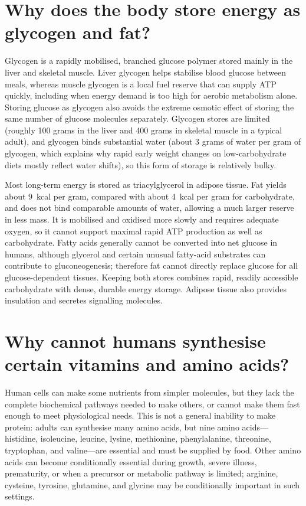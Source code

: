 \documentclass[11pt,oneside]{report}
\begin{document}
\section{Why does the body store energy as glycogen and fat?}

Glycogen is a rapidly mobilised, branched glucose polymer stored mainly in the
liver and skeletal muscle. Liver glycogen helps stabilise blood glucose between
meals, whereas muscle glycogen is a local fuel reserve that can supply ATP
quickly, including when energy demand is too high for aerobic metabolism alone.
Storing glucose as glycogen also avoids the extreme osmotic effect of storing
the same number of glucose molecules separately. Glycogen stores are limited (roughly 100 grams in the liver and 400 grams in
skeletal muscle in a typical adult), and glycogen binds substantial water (about
3 grams of water per gram of glycogen, which explains why rapid early weight
changes on low-carbohydrate diets mostly reflect water shifts), so this form of
storage is relatively bulky.

Most long-term energy is stored as triacylglycerol in adipose tissue. Fat yields
about 9~kcal per gram, compared with about 4~kcal per gram for carbohydrate,
and does not bind comparable amounts of water, allowing a much larger reserve
in less mass. It is mobilised and oxidised more slowly and requires adequate
oxygen, so it cannot support maximal rapid ATP production as well as
carbohydrate. Fatty acids generally cannot be converted into net glucose in
humans, although glycerol and certain unusual fatty-acid substrates can
contribute to gluconeogenesis; therefore fat cannot directly replace glucose
for all glucose-dependent tissues. Keeping both stores combines rapid,
readily accessible carbohydrate with dense, durable energy storage. Adipose
tissue also provides insulation and secretes signalling molecules.

\section{Why cannot humans synthesise certain vitamins and amino acids?}

Human cells can make some nutrients from simpler molecules, but they lack the
complete biochemical pathways needed to make others, or cannot make them fast
enough to meet physiological needs. This is not a general inability to make
protein: adults can synthesise many amino acids, but nine amino acids---
histidine, isoleucine, leucine, lysine, methionine, phenylalanine, threonine,
tryptophan, and valine---are essential and must be supplied by food. Other
amino acids can become conditionally essential during growth, severe illness,
prematurity, or when a precursor or metabolic pathway is limited; arginine,
cysteine, tyrosine, glutamine, and glycine may be conditionally important in
such settings.
\end{document}

